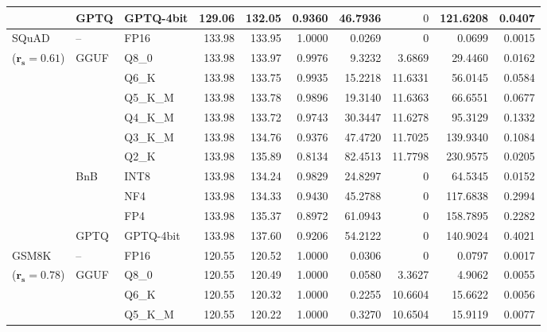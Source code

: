 \begin{longtable}{ll l rrrrrrr}
 & GPTQ & GPTQ-4bit & 129.06 & 132.05 & \cellcolor{red!18} 0.9360 & \cellcolor{red!18} 46.7936 & \cellcolor{cyan!12} $0$ & \cellcolor{red!18} 121.6208 & \cellcolor{red!18} 0.0407 \\
\midrule
SQuAD & -- & FP16 & 133.98 & 133.95 & 1.0000 & 0.0269 & \cellcolor{cyan!12} $0$ & 0.0699 & 0.0015 \\
{\small ($\mathbf{r_s{=}0.61}$)} & GGUF & Q8\_0 & 133.98 & 133.97 & 0.9976 & 9.3232 & 3.6869 & 29.4460 & 0.0162 \\
 &  & Q6\_K & 133.98 & 133.75 & 0.9935 & 15.2218 & 11.6331 & 56.0145 & 0.0584 \\
 &  & Q5\_K\_M & 133.98 & 133.78 & 0.9896 & 19.3140 & 11.6363 & 66.6551 & 0.0677 \\
 &  & Q4\_K\_M & 133.98 & 133.72 & 0.9743 & 30.3447 & 11.6278 & 95.3129 & 0.1332 \\
 &  & Q3\_K\_M & 133.98 & 134.76 & \cellcolor{red!18} 0.9376 & \cellcolor{red!18} 47.4720 & 11.7025 & \cellcolor{red!18} 139.9340 & \cellcolor{red!18} 0.1084 \\
 &  & Q2\_K & 133.98 & 135.89 & \cellcolor{red!18} 0.8134 & \cellcolor{red!18} 82.4513 & 11.7798 & \cellcolor{red!18} 230.9575 & \cellcolor{red!18} 0.0205 \\
 & BnB & INT8 & 133.98 & 134.24 & 0.9829 & 24.8297 & \cellcolor{cyan!12} $0$ & 64.5345 & 0.0152 \\
 &  & NF4 & 133.98 & 134.33 & \cellcolor{red!18} 0.9430 & \cellcolor{red!18} 45.2788 & \cellcolor{cyan!12} $0$ & \cellcolor{red!18} 117.6838 & \cellcolor{red!18} 0.2994 \\
 &  & FP4 & 133.98 & 135.37 & \cellcolor{red!18} 0.8972 & \cellcolor{red!18} 61.0943 & \cellcolor{cyan!12} $0$ & \cellcolor{red!18} 158.7895 & \cellcolor{red!18} 0.2282 \\
 & GPTQ & GPTQ-4bit & 133.98 & 137.60 & \cellcolor{red!18} 0.9206 & \cellcolor{red!18} 54.2122 & \cellcolor{cyan!12} $0$ & \cellcolor{red!18} 140.9024 & \cellcolor{red!18} 0.4021 \\
\midrule
GSM8K & -- & FP16 & 120.55 & 120.52 & 1.0000 & 0.0306 & \cellcolor{cyan!12} $0$ & 0.0797 & 0.0017 \\
{\small ($\mathbf{r_s{=}0.78}$)} & GGUF & Q8\_0 & 120.55 & 120.49 & 1.0000 & 0.0580 & 3.3627 & 4.9062 & 0.0055 \\
 &  & Q6\_K & 120.55 & 120.32 & 1.0000 & 0.2255 & 10.6604 & 15.6622 & 0.0056 \\
 &  & Q5\_K\_M & 120.55 & 120.22 & 1.0000 & 0.3270 & 10.6504 & 15.9119 & 0.0077 \\

\end{longtable}

